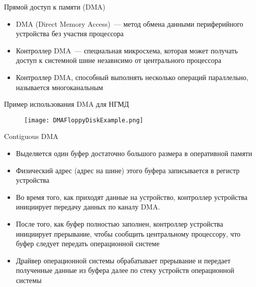 \documentclass[aspectratio=169,14pt]{beamer}
\begin{document}
\begin{frame}{Прямой доступ к памяти (DMA)}
    \begin{itemize}
        \item DMA (Direct Memory Access)~--- метод обмена данными
        периферийного устройства без участия процессора
        \item Контроллер DMA~--- специальная микросхема, которая может
        получать доступ к системной шине независимо от центрального
        процессора
        \item Контроллер DMA, способный выполнять несколько операций
        параллельно, называется многоканальным
    \end{itemize}
\end{frame}

\begin{frame}{Пример использования DMA для НГМД}
    \begin{figure}
        \centering
        \texttt{[image: DMAFloppyDiskExample.png]}
    \end{figure}
\end{frame}

\begin{frame}{Contiguous DMA}
    \begin{spacing}{0.8}
        \begin{itemize}
            \item Выделяется один буфер достаточно большого размера в
            оперативной памяти
            \item Физический адрес (адрес на шине) этого буфера
            записывается в регистр устройства
            \item Во время того, как приходят данные на устройство,
            контроллер устройства инициирует передачу данных по каналу DMA.
            \item После того, как буфер полностью заполнен, контроллер
            устройства инициирует прерывание, чтобы сообщить центральному
            процессору, что буфер следует передать операционной системе
            \item Драйвер операционной системы обрабатывает прерывание
            и передает полученные данные из буфера далее по стеку
            устройств операционной системы
        \end{itemize}
    \end{spacing}
\end{frame}
\end{document}
